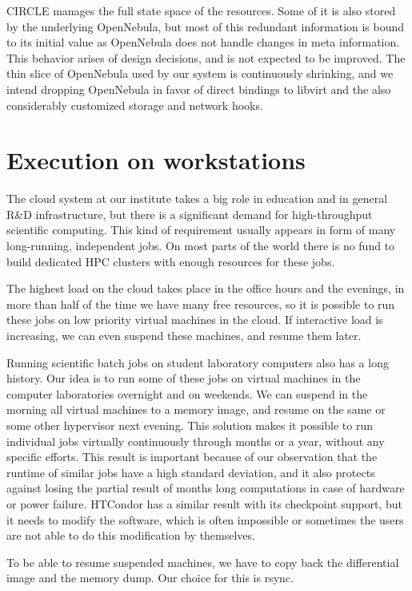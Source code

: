 \documentclass{llncs}
\begin{document}
CIRCLE manages the full state space of the resources. Some of it is also stored by the underlying OpenNebula, but most of this redundant information is bound to its initial value as OpenNebula does not handle changes in meta information. This behavior arises of design decisions, and is not expected to be improved. The thin slice of OpenNebula used by our system is continuously shrinking, and we intend dropping OpenNebula in favor of direct bindings to libvirt and the also considerably customized storage and network hooks.

\section{Execution on workstations}
The cloud system at our institute takes a big role in education and in general R{\&}D infrastructure, but there is a significant demand for high-throughput scientific computing. This  kind of requirement usually appears in form of many long-running, independent jobs. On most parts of the world there is no fund to build dedicated HPC clusters with enough resources for these jobs.

The highest load on the cloud takes place in the office hours and the evenings, in more than half of the time we have many free resources, so it is possible to run these jobs on low priority virtual machines in the cloud. If interactive load is increasing, we can even suspend these machines, and resume them later.

Running scientific batch jobs on student laboratory computers also has a long history. Our idea is to run some of these jobs on virtual machines in the computer laboratories overnight and on weekends. We can suspend in the morning all virtual machines to a memory image, and resume on the same or some other hypervisor next evening. This solution makes it possible to run individual jobs virtually continuously through months or a year, without any specific efforts. This result is important because of our observation that the runtime of similar jobs have a high standard deviation, and it also protects against losing the partial result of months long computations in case of hardware or power failure. HTCondor has a similar result with its checkpoint support, but it needs to modify the software, which is often impossible or sometimes the users are not able to do this modification by themselves. 

To be able to resume suspended machines, we have to copy back the differential image and the memory dump. Our choice for this is rsync.
\end{document}
